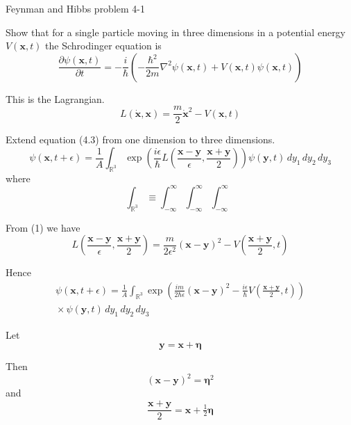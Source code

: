 \documentclass[12pt]{article}
\begin{document}
Feynman and Hibbs problem 4-1

\bigskip
Show that for a single particle moving in three dimensions
in a potential energy $V(\mathbf x,t)$ the Schrodinger equation is
\begin{equation*}
\frac{\partial\psi(\mathbf x,t)}{\partial t}
=-\frac{i}{\hbar}\left(
-\frac{\hbar^2}{2m}\nabla^2\psi(\mathbf x,t)+V(\mathbf x,t)\psi(\mathbf x,t)\right)
\end{equation*}

This is the Lagrangian.
\begin{equation*}
L(\dot{\mathbf x},\mathbf x)=\frac{m}{2}\dot{\mathbf x}^2-V(\mathbf{x},t)\tag{1}
\end{equation*}

Extend equation (4.3) from one dimension to three dimensions.
\begin{equation*}
\psi(\mathbf{x},t+\epsilon)
=\frac{1}{A}\int_{\mathbb R^3}
\exp\left(
\frac{i\epsilon}{\hbar}L
\left(\frac{\mathbf{x}-\mathbf{y}}{\epsilon},\frac{\mathbf{x}+\mathbf{y}}{2}\right)
\right)\psi(\mathbf{y},t)\,dy_1\,dy_2\,dy_3
\end{equation*}
where
\begin{equation*}
\int_{\mathbb R^3}
\equiv\int_{-\infty}^\infty\int_{-\infty}^\infty\int_{-\infty}^\infty
\end{equation*}

From (1) we have
\begin{equation*}
L\left(\frac{\mathbf{x}-\mathbf{y}}{\epsilon},\frac{\mathbf{x}+\mathbf{y}}{2}\right)
=\frac{m}{2\epsilon^2}(\mathbf{x}-\mathbf{y})^2
-V\left(\frac{\mathbf{x}+\mathbf{y}}{2},t\right)
\end{equation*}

Hence
\begin{multline*}
\psi(\mathbf{x},t+\epsilon)=
\frac{1}{A}\int_{\mathbb R^3}
\exp\left(
\frac{im}{2\hbar\epsilon}(\mathbf{x}-\mathbf{y})^2
-\frac{i\epsilon}{\hbar}V\left(\frac{\mathbf{x}+\mathbf{y}}{2},t\right)
\right)
\\
{}\times\psi(\mathbf{y},t)\,dy_1\,dy_2\,dy_3
\end{multline*}

Let
\begin{equation*}
\mathbf y=\mathbf x+\boldsymbol\eta
\end{equation*}

Then
\begin{equation*}
(\mathbf x-\mathbf y)^2=\boldsymbol\eta^2
\end{equation*}
and
\begin{equation*}
\frac{\mathbf x+\mathbf y}{2}=\mathbf{x}+\tfrac{1}{2}\boldsymbol\eta
\end{equation*}
\end{document}
